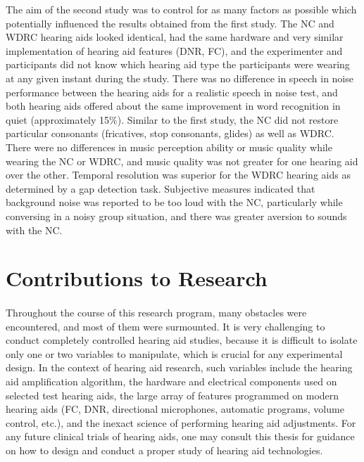 The aim of the second study was to control for as many factors as possible which potentially influenced the results obtained from the first study.  The NC and WDRC hearing aids looked identical, had the same hardware and very similar implementation of hearing aid features (DNR, FC), and the experimenter and participants did not know which hearing aid type the participants were wearing at any given instant during the study.  There was no difference in speech in noise performance between the hearing aids for a realistic speech in noise test, and both hearing aids offered about the same improvement in word recognition in quiet (approximately 15\%).  Similar to the first study, the NC did not restore particular consonants (fricatives, stop consonants, glides) as well as WDRC.  There were no differences in music perception ability or music quality while wearing the NC or WDRC, and music quality was not greater for one hearing aid over the other.  Temporal resolution was superior for the WDRC hearing aids as determined by a gap detection task.  Subjective measures indicated that background noise was reported to be too loud with the NC, particularly while conversing in a noisy group situation, and there was greater aversion to sounds with the NC.

\section{Contributions to Research}
\paragraph{}Throughout the course of this research program, many obstacles were encountered, and most of them were surmounted.  It is very challenging to conduct completely controlled hearing aid studies, because it is difficult to isolate only one or two variables to manipulate, which is crucial for any experimental design.  In the context of hearing aid research, such variables include the hearing aid amplification algorithm, the hardware and electrical components used on selected test hearing aids, the large array of features programmed on modern hearing aids (FC, DNR, directional microphones, automatic programs, volume control, etc.), and the inexact science of performing hearing aid adjustments.  For any future clinical trials of hearing aids, one may consult this thesis for guidance on how to design and conduct a proper study of hearing aid technologies.

